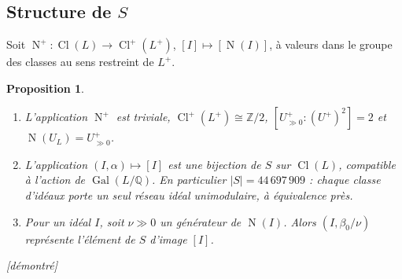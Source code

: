 \documentclass[11pt,a4paper]{amsart}
\theoremstyle{plain}
\newtheorem{proposition}[theoreme]{Proposition}
\theoremstyle{definition}
\numberwithin{equation}{section}
\newcommand{\Q}{\mathbb{Q}}
\newcommand{\Z}{\mathbb{Z}}
\DeclareMathOperator{\Nm}{N}
\DeclareMathOperator{\Cl}{Cl}
\DeclareMathOperator{\Gal}{Gal}
\newcommand{\Clp}{\Cl^{+}}
\newcommand{\Up}{U^{+}}
\newcommand{\Upp}{U^{+}_{\gg0}}
\newcommand{\st}[1]{\textup{\textsf{\small[#1]}}}
\newcommand{\DEM}{\st{démontré}}
\begin{document}
\subsection{Structure de \texorpdfstring{$S$}{S}}
Soit $\Nm^+\colon\Cl(L)\to\Clp(L^+)$, $[I]\mapsto[\Nm(I)]$, à valeurs dans le groupe des classes au sens restreint de $L^+$.

\begin{proposition}\label{prop:S}
\begin{enumerate}[label=\textup{(\alph*)}]
\item L'application $\Nm^+$ est triviale, $\Clp(L^+)\cong\Z/2$, $[\Upp:(\Up)^2]=2$ et $\Nm(U_L)=\Upp$.
\item L'application $(I,\alpha)\mapsto[I]$ est une bijection de $S$ sur $\Cl(L)$, compatible à l'action de $\Gal(L/\Q)$. En particulier $|S|=44\,697\,909$ : chaque classe d'idéaux porte un seul réseau idéal unimodulaire, à équivalence près.
\item Pour un idéal $I$, soit $\nu\gg0$ un générateur de $\Nm(I)$. Alors $(I,\beta_0/\nu)$ représente l'élément de $S$ d'image $[I]$.
\end{enumerate}
\DEM
\end{proposition}
\end{document}
